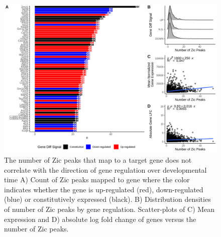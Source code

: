 \documentclass[fleqn,10pt]{wlscirep}
\begin{document}


\begin{figure}[ht]
\centering
\includegraphics[width=.90\linewidth]{../figures/supp_figure3.png}
\caption{ The number of Zic peaks that map to a target gene does not correlate with the direction of gene regulation over developmental time A) Count of Zic peaks mapped to gene where the color indicates whether the gene is up-regulated (red), down-regulated (blue) or constitutively expressed (black). B) Distribution densities of number of Zic peaks by gene regulation.  Scatter-plots of C) Mean expression and D) absolute log fold change of genes versus the number of Zic peaks. }
\label{fig:nPeakstoGenes}
\end{figure}




\end{document}
